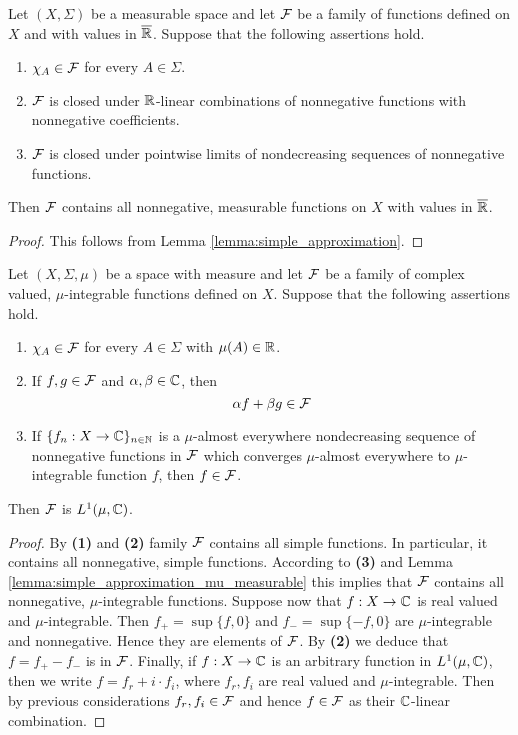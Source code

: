 \begin{corollary}\label{corollary:measurable_induction_for_nonnegative}
Let $(X,\Sigma)$ be a measurable space and let ${\mathcal F}$ be a family of functions defined on $X$ and with values in $\overline{{\mathbb R}}$. Suppose that the following assertions hold.
\begin{enumerate}[label=\emph{\textbf{(\arabic*)}}, leftmargin=*]
\item $\chi_A\in {\mathcal F}$ for every $A\in \Sigma$.
\item ${\mathcal F}$ is closed under ${\mathbb R}$-linear combinations of nonnegative functions with nonnegative coefficients.
\item ${\mathcal F}$ is closed under pointwise limits of nondecreasing sequences of nonnegative functions.
\end{enumerate}
Then ${\mathcal F}$ contains all nonnegative, measurable functions on $X$ with values in $\overline{{\mathbb R}}$.
\end{corollary}
\begin{proof}
This follows from Lemma \ref{lemma:simple_approximation}.
\end{proof}

\begin{corollary}\label{corollary:measurable_induction_for_complex}
Let $(X,\Sigma,\mu)$ be a space with measure and let ${\mathcal F}$ be a family of complex valued, $\mu$-integrable functions defined on $X$. Suppose that the following assertions hold.
\begin{enumerate}[label=\emph{\textbf{(\arabic*)}}, leftmargin=*]
\item $\chi_A\in {\mathcal F}$ for every $A\in \Sigma$ with $\mu(A)\in {\mathbb R}$.
\item If $f, g\in {\mathcal F}$ and $\alpha, \beta\in {\mathbb C}$, then
$$\alpha f + \beta g\in {\mathcal F}$$
\item If $\{f_n:X\rightarrow {\mathbb C}\}_{n\in {\mathbb N}}$ is a $\mu$-almost everywhere nondecreasing sequence of nonnegative functions in ${\mathcal F}$ which converges $\mu$-almost everywhere to $\mu$-integrable function $f$, then $f\in {\mathcal F}$.
\end{enumerate}
Then ${\mathcal F}$ is $L^1(\mu, {\mathbb C})$.
\end{corollary}
\begin{proof}
By \textbf{(1)} and \textbf{(2)} family ${\mathcal F}$ contains all simple functions. In particular, it contains all nonnegative, simple functions. According to \textbf{(3)} and Lemma \ref{lemma:simple_approximation_mu_measurable} this implies that ${\mathcal F}$ contains all nonnegative, $\mu$-integrable functions. Suppose now that $f:X\rightarrow {\mathbb C}$ is real valued and $\mu$-integrable. Then $f_+ = \sup \{f, 0\}$ and $f_- = \sup\{-f, 0\}$ are $\mu$-integrable and nonnegative. Hence they are elements of ${\mathcal F}$. By \textbf{(2)} we deduce that $f = f_+ - f_-$ is in ${\mathcal F}$. Finally, if $f:X\rightarrow {\mathbb C}$ is an arbitrary function in $L^1(\mu, {\mathbb C})$, then we write $f = f_r + i\cdot f_i$, where $f_r, f_i$ are real valued and $\mu$-integrable. Then by previous considerations $f_r,f_i\in {\mathcal F}$ and hence $f\in {\mathcal F}$ as their ${\mathbb C}$-linear combination.
\end{proof}

